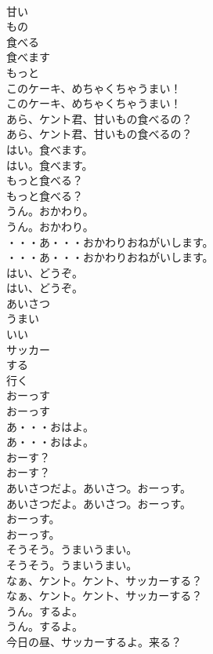 \documentclass[8pt]{extreport}
\begin{document}
\begin{CJK}{UTF8}{min}
\\	甘い
\\	もの
\\	食べる
\\	食べます
\\	もっと
\\	このケーキ、めちゃくちゃうまい！	
\\	このケーキ、めちゃくちゃうまい！ 
\\	あら、ケント君、甘いもの食べるの？	
\\	あら、ケント君、甘いもの食べるの？ 
\\	はい。食べます。	
\\	はい。食べます。 
\\	もっと食べる？	
\\	もっと食べる？ 
\\	うん。おかわり。	
\\	うん。おかわり。 
\\	・・・あ・・・おかわりおねがいします。	
\\	・・・あ・・・おかわりおねがいします。 
\\	はい、どうぞ。	
\\	はい、どうぞ。 
\\	あいさつ
\\	うまい
\\	いい
\\	サッカー
\\	する
\\	行く
\\	おーっす	
\\	おーっす 
\\	あ・・・おはよ。	
\\	あ・・・おはよ。 
\\	おーす？	
\\	おーす？ 
\\	あいさつだよ。あいさつ。おーっす。	
\\	あいさつだよ。あいさつ。おーっす。 
\\	おーっす。	
\\	おーっす。 
\\	そうそう。うまいうまい。	
\\	そうそう。うまいうまい。 
\\	なぁ、ケント。ケント、サッカーする？	
\\	なぁ、ケント。ケント、サッカーする？ 
\\	うん。するよ。	
\\	うん。するよ。 
\\	今日の昼、サッカーするよ。来る？	

\end{CJK}
\end{document}
